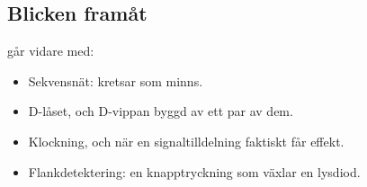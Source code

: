 \subsection*{Blicken framåt}
 går vidare med:
\begin{itemize}
  \item Sekvensnät: kretsar som minns.
  \item D-låset, och D-vippan byggd av ett par av dem.
  \item Klockning, och när en signaltilldelning faktiskt får effekt.
  \item Flankdetektering: en knapptryckning som växlar en lysdiod.
\end{itemize}
